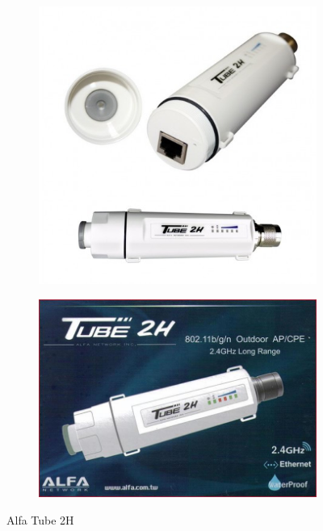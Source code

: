 \begin{figure}[h]
	\centering
	\begin{subfigure}{0.5\textwidth}
		\centering
		\includegraphics[scale=0.55]{Pictures/tube2h2.jpg}
	\end{subfigure}%
	\begin{subfigure}{0.5\textwidth}
		\centering
		\includegraphics[scale=0.35]{Pictures/tube2h.jpg}
	\end{subfigure}
	\caption{Alfa Tube 2H}
	\label{fig: tube2h}
\end{figure}

